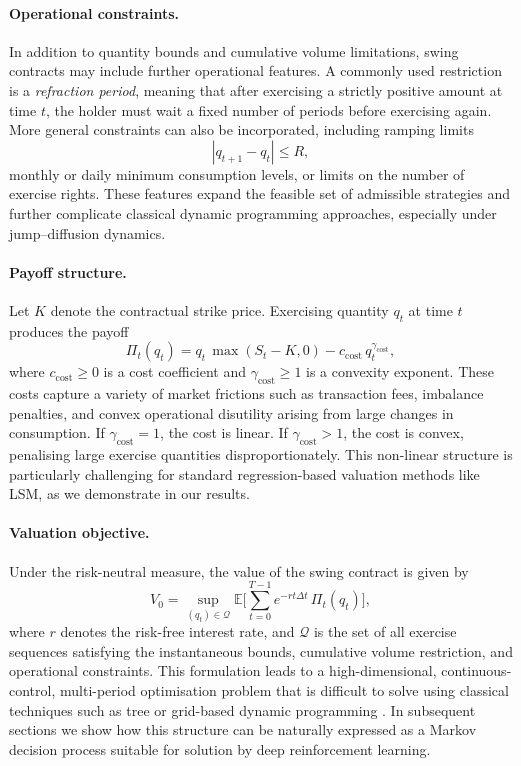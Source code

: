 \documentclass[a4paper,fleqn]{cas-dc}
\begin{document}
\paragraph{Operational constraints.}
In addition to quantity bounds and cumulative volume limitations, swing contracts may include further operational features. A commonly used restriction is a \emph{refraction period}, meaning that after exercising a strictly positive amount at time \(t\), the holder must wait a fixed number of periods before exercising again. More general constraints can also be incorporated, including ramping limits
\[
|q_{t+1} - q_t| \le R,
\]
monthly or daily minimum consumption levels, or limits on the number of exercise rights. These features expand the feasible set of admissible strategies and further complicate classical dynamic programming approaches, especially under jump–diffusion dynamics.

\paragraph{Payoff structure.}
Let \(K\) denote the contractual strike price. Exercising quantity \(q_t\) at time \(t\) produces the payoff
\[
\Pi_t(q_t)
=
q_t \, \max(S_t - K, 0)
 - c_{\mathrm{cost}} \, q_t^{\gamma_{\mathrm{cost}}},
\]
where \(c_{\mathrm{cost}} \ge 0\) is a cost coefficient and \(\gamma_{\mathrm{cost}} \ge 1\) is a convexity exponent. These costs capture a variety of market frictions such as transaction fees, imbalance penalties, and convex operational disutility arising from large changes in consumption. If \(\gamma_{\mathrm{cost}} = 1\), the cost is linear. If \(\gamma_{\mathrm{cost}} > 1\), the cost is convex, penalising large exercise quantities disproportionately. This non-linear structure is particularly challenging for standard regression-based valuation methods like LSM, as we demonstrate in our results.

\paragraph{Valuation objective.}
Under the risk-neutral measure, the value of the swing contract is given by
\[
V_0
=
\sup_{(q_t) \in \mathcal{Q}}
\mathbb{E}
\Bigg[
\sum_{t=0}^{T-1}
e^{-r t \Delta t}
\, \Pi_t(q_t)
\Bigg],
\]
where \(r\) denotes the risk-free interest rate, and \(\mathcal{Q}\) is the set of all exercise sequences satisfying the instantaneous bounds, cumulative volume restriction, and operational constraints. This formulation leads to a high-dimensional, continuous-control, multi-period optimisation problem that is difficult to solve using classical techniques such as tree or grid-based dynamic programming \cite{Hambly2009,jaillet2004valuation,meinshausen2004monte,carmona2004swing}. In subsequent sections we show how this structure can be naturally expressed as a Markov decision process suitable for solution by deep reinforcement learning.
\end{document}
